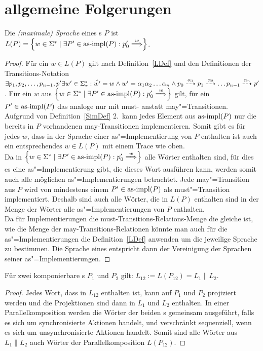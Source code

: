 \chapter{allgemeine Folgerungen}

\begin{Prop}
  \label{LImpProp}
  Die \emph{(maximale) Sprache} eines \MEIO{}s $P$ ist $L(P) = \left\{w\in
  \Sigma ^* \mid \exists P'\in\asimp (P) : p'_0\weakmust[w]
  \right\}$.
\end{Prop}
\begin{proof}
  Für ein $w\in L(P)$ gilt nach Definition~\ref{LDef} und den
  Definitionen der Transitions-Notation $\exists p_1,p_2,\dots,p_{n-1},p' \exists
  w'\in\Sigma _{\tau} ^* : \hat{w'} = w \land w'=\alpha _1\alpha _2\dots\alpha
  _n \land p_0\may[\alpha _1]p_1\may[\alpha _2] \dots p_{n-1}\may[\alpha _n]
  p'$. Für ein $w$ aus $\left\{w\in \Sigma ^* \mid \exists P'\in\asimp (P) :
  p'_0\weakmust[w] \right\}$ gilt, für ein $P'\in\mathrm{as}\text{-}\mathrm{impl} (P)$ das analoge nur
  mit must- anstatt may"=Transitionen.\\
  Aufgrund von Definition~\ref{SimDef} 2.\ kann jedes Element aus $\mathrm{as}\text{-}\mathrm{impl} (P)$
  nur die bereits in $P$ vorhandenen may-Transitionen implementieren. Somit
  gibt es für jedes $w$, dass in der Sprache einer as"=Implementierung von $P$
  enthalten ist auch ein entsprechendes $w\in L(P)$ mit einem Trace wie oben.\\
  Da in $\left\{w\in \Sigma ^* \mid \exists P'\in\asimp (P) : p'_0\weakmust[w]
  \right\}$ alle Wörter enthalten sind, für dies es eine as"=Implementierung
  gibt, die dieses Wort ausführen kann, werden somit auch alle möglichen
  as"=Implementierungen betrachtet. Jede may"=Transition aus $P$ wird von
  mindestens einem $P'\in\mathrm{as}\text{-}\mathrm{impl} (P)$ als must"=Transition implementiert.
  Deshalb sind auch alle Wörter, die in $L(P)$ enthalten sind in der Menge der
  Wörter alle as"=Implementierungen von $P$ enthalten.\\
  Da für Implementierungen die must-Transitions-Relations-Menge die gleiche ist,
  wie die Menge der may-Transitions-Relationen könnte man auch für die
  as"=Implementierungen die Definition~\ref{LDef} anwenden um die jeweilige
  Sprache zu bestimmen. Die Sprache eines \MEIO{} entspricht dann der
  Vereinigung der Sprachen seiner as"=Implementierungen.
\end{proof}

\begin{Prop}
  Für zwei komponierbare \MEIO{}s $P_1$ und $P_2$ gilt: $L_{12} := L(P_{12}) =
  L_1\|L_2$.
\end{Prop}
\begin{proof}
  Jedes Wort, dass in $L_{12}$ enthalten ist, kann auf $P_1$ und $P_2$
  projiziert werden und die Projektionen sind dann in $L_1$ und $L_2$
  enthalten. In einer Parallelkomposition werden die Wörter der beiden \MEIO{}s
  gemeinsam ausgeführt, falls es sich um synchronisierte Aktionen handelt, und
  verschränkt sequenziell, wenn es sich um unsynchronisierte Aktionen handelt.
  Somit sind alle Wörter aus $L_1\|L_2$ auch Wörter der Parallelkomposition
  $L(P_{12})$.
\end{proof}

